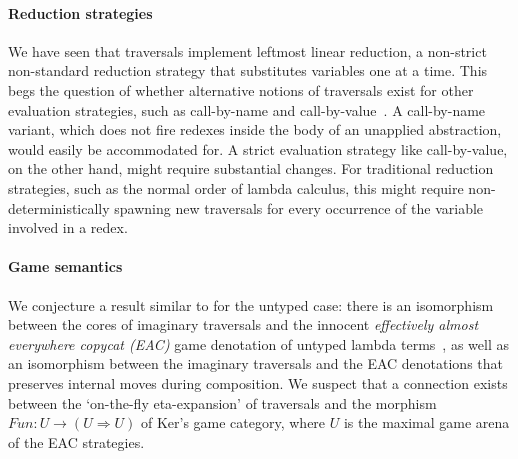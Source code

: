 \documentclass[xchauthor,chkrefs,GCNS,amsmath,amsthm,rotating,leaveRGB]{tcsg}
\theoremstyle{plain}
\theoremstyle{definition}
\begin{document}
\paragraph*{Reduction strategies}
We have seen that traversals implement leftmost linear reduction, a
non-strict non-standard reduction strategy that substitutes variables one at
a time. This begs the question of whether alternative notions of traversals
exist for other evaluation strategies, such as call-by-name and
call-by-value~\cite{plotkin-75}. A call-by-name variant, which does not fire
redexes inside the body of an unapplied abstraction, would easily be
accommodated for. A strict evaluation strategy like call-by-value, on the
other hand, might require substantial changes. For traditional reduction
strategies, such as the normal order of lambda calculus, this might require
non-deterministically spawning new traversals for every occurrence of the
variable involved in a redex.

\paragraph*{Game semantics}
We conjecture a result similar to
 for the untyped case:
there is an isomorphism between the cores of imaginary traversals and the
innocent \emph{effectively almost everywhere copycat (EAC)} game denotation
of untyped lambda terms~\cite{KerThesis}, as well as an isomorphism between
the imaginary traversals and the EAC denotations that preserves internal
moves during composition. We suspect that a connection exists between the
`on-the-fly eta-expansion' of traversals and the morphism $Fun : U
\rightarrow (U \Rightarrow U)$ of Ker's game category, where $U$ is the
maximal game arena of the EAC strategies.
\end{document}
